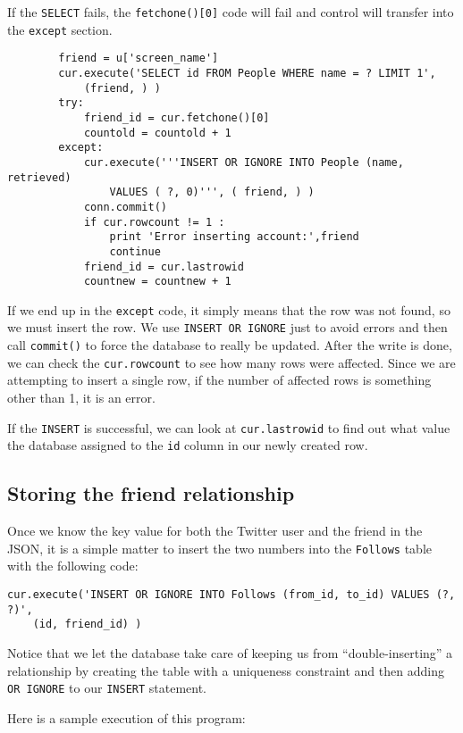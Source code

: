 If the {\tt SELECT} fails, the {\tt fetchone()[0]} code will fail
and control will transfer into the {\tt except} section.

\beforeverb
\begin{verbatim}
        friend = u['screen_name']
        cur.execute('SELECT id FROM People WHERE name = ? LIMIT 1',
            (friend, ) )
        try:
            friend_id = cur.fetchone()[0]
            countold = countold + 1
        except:
            cur.execute('''INSERT OR IGNORE INTO People (name, retrieved) 
                VALUES ( ?, 0)''', ( friend, ) )
            conn.commit()
            if cur.rowcount != 1 :
                print 'Error inserting account:',friend
                continue
            friend_id = cur.lastrowid
            countnew = countnew + 1
\end{verbatim}
\afterverb
%
If we end up in the {\tt except} code, it simply means that the row
was not found, so we must insert the row.  We use {\tt INSERT OR 
IGNORE} just to avoid errors and then call {\tt commit()} to 
force the database to really be updated.  After the write is done, we can 
check the {\tt cur.rowcount} to see how many rows were affected.  Since
we are attempting to insert a single row, if the number of 
affected rows is something other than 1, it is an error.  

If the {\tt INSERT} is successful, we can look at {\tt cur.lastrowid} 
to find out what value the database assigned to the {\tt id} column in 
our newly created row.

\subsection{Storing the friend relationship}

Once we know the key value for both the Twitter user
and the friend in the JSON, it is a simple matter to insert
the two numbers into the {\tt Follows} table
with the following code:

\beforeverb
\begin{verbatim}
cur.execute('INSERT OR IGNORE INTO Follows (from_id, to_id) VALUES (?, ?)',
    (id, friend_id) )
\end{verbatim}
\afterverb
%
Notice that we let the database take care of keeping us from ``double-inserting''
a relationship by creating the table with a uniqueness constraint and then
adding {\tt OR IGNORE} to our {\tt INSERT} statement.

Here is a sample execution of this program:

